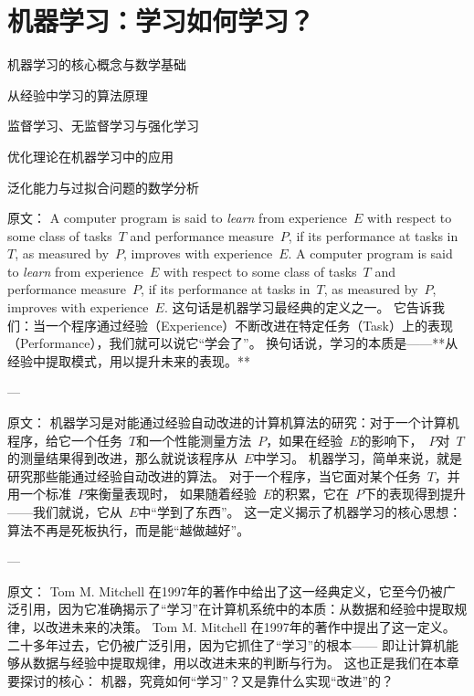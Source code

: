 \chapter{机器学习：学习如何学习？}\label{ch:机器学习}

\begin{introduction}
  \item 机器学习的核心概念与数学基础
  \item 从经验中学习的算法原理
  \item 监督学习、无监督学习与强化学习
  \item 优化理论在机器学习中的应用
  \item 泛化能力与过拟合问题的数学分析
\end{introduction}

原文：
A computer program is said to {\em learn} from experience~$E$ with respect to some class of tasks~$T$ and performance measure~$P$, if its performance at tasks in~$T$, as measured by~$P$, improves with experience~$E$.
A computer program is said to {\em learn} from experience~$E$ with respect to some class of tasks~$T$ and performance measure~$P$, if its performance at tasks in~$T$, as measured by~$P$, improves with experience~$E$.  
这句话是机器学习最经典的定义之一。  
它告诉我们：当一个程序通过经验（Experience）不断改进在特定任务（Task）上的表现（Performance），我们就可以说它“学会了”。  
换句话说，学习的本质是——**从经验中提取模式，用以提升未来的表现。**

---

原文：
机器学习是对能通过经验自动改进的计算机算法的研究：对于一个计算机程序，给它一个任务~$T$和一个性能测量方法~$P$，如果在经验~$E$的影响下，~$P$对~$T$的测量结果得到改进，那么就说该程序从~$E$中学习。
机器学习，简单来说，就是研究那些能通过经验自动改进的算法。  
对于一个程序，当它面对某个任务~$T$，并用一个标准~$P$来衡量表现时，  
如果随着经验~$E$的积累，它在~$P$下的表现得到提升——我们就说，它从~$E$中“学到了东西”。  
这一定义揭示了机器学习的核心思想：算法不再是死板执行，而是能“越做越好”。

---

原文：
Tom M. Mitchell 在1997年的著作中给出了这一经典定义，它至今仍被广泛引用，因为它准确揭示了“学习”在计算机系统中的本质：从数据和经验中提取规律，以改进未来的决策。
Tom M. Mitchell 在1997年的著作中提出了这一定义。  
二十多年过去，它仍被广泛引用，因为它抓住了“学习”的根本——  
即让计算机能够从数据与经验中提取规律，用以改进未来的判断与行为。  
这也正是我们在本章要探讨的核心：  
机器，究竟如何“学习”？又是靠什么实现“改进”的？

